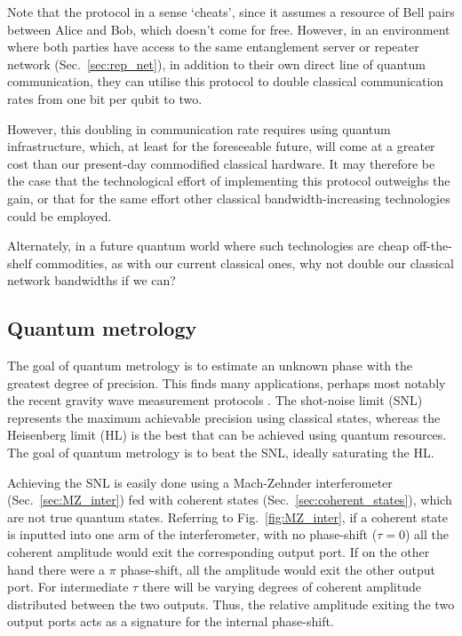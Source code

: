 Note that the protocol in a sense `cheats', since it assumes a resource of Bell pairs between Alice and Bob, which doesn't come for free. However, in an environment where both parties have access to the same entanglement server or repeater network (Sec.~\ref{sec:rep_net}), in addition to their own direct line of quantum communication, they can utilise this protocol to double classical communication rates from one bit per qubit to two.

However, this doubling in communication rate requires using quantum infrastructure, which, at least for the foreseeable future, will come at a greater cost than our present-day commodified classical hardware. It may therefore be the case that the technological effort of implementing this protocol outweighs the gain, or that for the same effort other classical bandwidth-increasing technologies could be employed.

Alternately, in a future quantum world where such technologies are cheap off-the-shelf commodities, as with our current classical ones, why not double our classical network bandwidths if we can?

%
%

\subsection{Quantum metrology} \label{sec:metrology} 

The goal of quantum metrology is to estimate an unknown phase with the greatest degree of precision. This finds many applications, perhaps most notably the recent gravity wave measurement protocols \cite{???}. The shot-noise limit (SNL) represents the maximum achievable precision using classical states, whereas the Heisenberg limit (HL) is the best that can be achieved using quantum resources. The goal of quantum metrology is to beat the SNL, ideally saturating the HL.

Achieving the SNL is easily done using a Mach-Zehnder interferometer (Sec.~\ref{sec:MZ_inter}) fed with coherent states (Sec.~\ref{sec:coherent_states}), which are not true quantum states. Referring to Fig.~\ref{fig:MZ_inter}, if a coherent state is inputted into one arm of the interferometer, with no phase-shift (\mbox{$\tau=0$}) all the coherent amplitude would exit the corresponding output port. If on the other hand there were a $\pi$ phase-shift, all the amplitude would exit the other output port. For intermediate $\tau$ there will be varying degrees of coherent amplitude distributed between the two outputs. Thus, the relative amplitude exiting the two output ports acts as a signature for the internal phase-shift.


